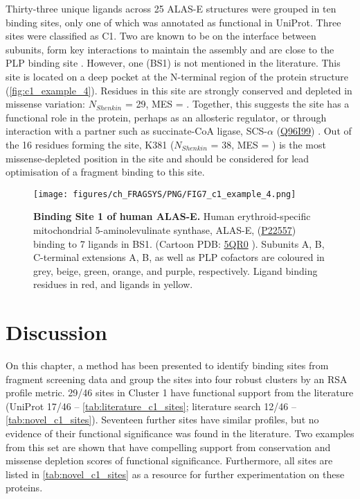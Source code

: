 Thirty-three unique ligands across 25 ALAS-E structures were grouped in ten binding sites, only one of which was annotated as functional in UniProt. Three sites were classified as C1. Two are known to be on the interface between subunits, form key interactions to maintain the assembly and are close to the PLP binding site \cite{BAILEY_2020_AMINOLEVULINATE}. However, one (BS1) is not mentioned in the literature. This site is located on a deep pocket at the N-terminal region of the protein structure (\autoref{fig:c1_example_4}). Residues in this site are strongly conserved and depleted in missense variation: $N_{Shenkin}$ = 29, MES = . Together, this suggests the site has a functional role in the protein, perhaps as an allosteric regulator, or through interaction with a partner such as succinate-CoA ligase, SCS-$\alpha$ (\href{https://www.uniprot.org/uniprotkb/Q96I99/entry}{Q96I99}) \cite{FURUYAMA_2000_SIDEROBLASTIC}. Out of the 16 residues forming the site, K381 ($N_{Shenkin}$ = 38, MES = ) is the most missense-depleted position in the site and should be considered for lead optimisation of a fragment binding to this site.

\begin{figure}[htb!]
    \centering
    \texttt{[image: figures/ch\_FRAGSYS/PNG/FIG7\_c1\_example\_4.png]}
    \caption[Binding Site 1 of human ALAS-E]{\textbf{Binding Site 1 of human ALAS-E.} Human erythroid-specific mitochondrial 5-amino\-levulinate synthase, ALAS-E, (\href{https://www.uniprot.org/uniprotkb/P22557/entry}{P22557}) binding to 7 ligands in BS1. (Cartoon PDB: \href{https://www.ebi.ac.uk/pdbe/entry/pdb/5qr0}{5QR0} \cite{PDB_5QR0}). Subunits A, B, C-terminal extensions A, B, as well as PLP cofactors are coloured in grey, beige, green, orange, and purple, respectively. Ligand binding residues in red, and ligands in yellow.}
    \label{fig:c1_example_4}
\end{figure}

\vspace{-13pt} %

\section{Discussion}

On this chapter, a method has been presented to identify binding sites from fragment screening data and group the sites into four robust clusters by an RSA profile metric. 29/46 sites in Cluster 1 have functional support from the literature (UniProt 17/46 -- \autoref{tab:literature_c1_sites}; literature search 12/46 -- \autoref{tab:novel_c1_sites}). Seventeen further sites have similar profiles, but no evidence of their functional significance was found in the literature. Two examples from this set are shown that have compelling support from conservation and missense depletion scores of functional significance. Furthermore, all sites are listed in \autoref{tab:novel_c1_sites} as a resource for further experimentation on these proteins.

